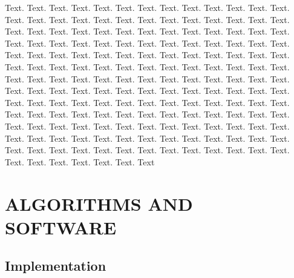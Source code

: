 \documentclass[a4,center,fleqn]{NAR}
\begin{document}

Text. Text. Text. Text. Text. Text.
Text. Text. Text. Text. Text. Text. Text. Text. Text. Text. Text.
Text. Text. Text. Text. Text. Text. Text. Text. Text. Text. Text.
Text. Text. Text. Text. Text. Text. Text. Text. Text. Text. Text.
Text. Text. Text. Text. Text. Text. Text. Text. Text. Text. Text.
Text. Text. Text. Text. Text. Text. Text. Text. Text. Text. Text.
Text. Text. Text. Text. Text. Text. Text. Text. Text. Text. Text.
Text. Text. Text. Text. Text. Text. Text. Text. Text. Text. Text.
Text. Text. Text. Text. Text. Text. Text. Text. Text. Text. Text.
Text. Text. Text. Text. Text. Text. Text. Text. Text. Text. Text.
Text. Text. Text. Text. Text. Text. Text. Text. Text. Text. Text.
Text. Text. Text. Text. Text. Text. Text. Text. Text. Text. Text.
Text. Text. Text. Text. Text. Text. Text. Text. Text. Text. Text.
Text. Text. Text. Text. Text. Text. Text. Text. Text. Text. Text.
Text. Text. Text. Text. Text. Text. Text. Text. Text. Text. Text.
Text. Text. Text. Text. Text. Text. Text. Text. Text. Text. Text.
Text. Text. Text. Text.
Text 

\section{ALGORITHMS AND SOFTWARE}

\subsection{Implementation}
\end{document}
